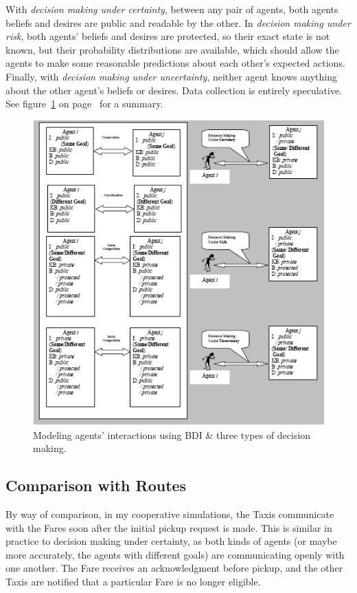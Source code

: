 \documentclass[11pt,letterpaper,onecolumn,twoside,openright,draft]{report}
\begin{document}
With \emph{decision making under certainty}, between any pair of agents, both agents beliefs and desires are public and readable by the other.
In \emph{decision making under risk}, both agents' beliefs and desires are protected, so their exact state is not known, but their probability distributions are available, which should allow the agents to make some reasonable predictions about each other's expected actions.
Finally, with \emph{decision making under uncertainty}, neither agent knows anything about the other agent's beliefs or desires.
Data collection is entirely speculative. See figure~\ref{fig:uncertainty-management} on page~\pageref{fig:uncertainty-management} for a summary.

\begin{figure}[h]
  \includegraphics{figures/uncertainty-management}
  \caption{Modeling agents' interactions using BDI \& three types of decision making.}
  \label{fig:uncertainty-management}
\end{figure}

\subsection{Comparison with Routes}
By way of comparison, in my cooperative simulations, the Taxis communicate with the Fares soon after the initial pickup request is made.
This is similar in practice to decision making under certainty, as both kinds of agents (or maybe more accurately, the agents with different goals) are communicating openly with one another.
The Fare receives an acknowledgment before pickup, and the other Taxis are notified that a particular Fare is no longer eligible.
\end{document}
